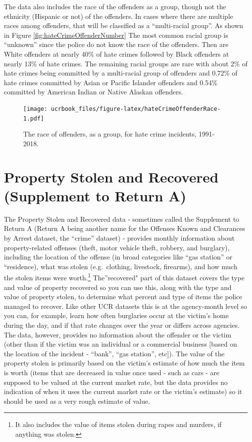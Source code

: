 \documentclass[
  12pt,
  openany]{book}
\begin{document}
The data also includes the race of the offenders as a group, though not the ethnicity (Hispanic or not) of the offenders. In cases where there are multiple races among offenders, that will be classified as a ``multi-racial group''. As shown in Figure \ref{fig:hateCrimeOffenderNumber} The most common racial group is ``unknown'' since the police do not know the race of the offenders. Then are White offenders at nearly 40\% of hate crimes followed by Black offenders at nearly 13\% of hate crimes. The remaining racial groups are rare with about 2\% of hate crimes being committed by a multi-racial group of offenders and 0.72\% of hate crimes committed by Asian or Pacific Islander offenders and 0.54\% committed by American Indian or Native Alaskan offenders.

\begin{figure}
\centering
\texttt{[image: ucrbook\_files/figure-latex/hateCrimeOffenderRace-1.pdf]}
\caption{\label{fig:hateCrimeOffenderRace}The race of offenders, as a group, for hate crime incidents, 1991-2018.}
\end{figure}

\hypertarget{stolen_property}{%
\chapter{Property Stolen and Recovered (Supplement to Return A)}\label{stolen_property}}

The Property Stolen and Recovered data - sometimes called the Supplement to Return A (Return A being another name for the Offenses Known and Clearances by Arrest dataset, the ``crime'' dataset) - provides monthly information about property-related offenses (theft, motor vehicle theft, robbery, and burglary), including the location of the offense (in broad categories like ``gas station'' or ``residence), what was stolen (e.g.~clothing, livestock, firearms), and how much the stolen items were worth.\footnote{It also includes the value of items stolen during rapes and murders, if anything was stolen.} The''recovered" part of this dataset covers the type and value of property recovered so you can use this, along with the type and value of property stolen, to determine what percent and type of items the police managed to recover. Like other UCR datasets this is at the agency-month level so you can, for example, learn how often burglaries occur at the victim's home during the day, and if that rate changes over the year or differs across agencies. The data, however, provides no information about the offender or the victim (other than if the victim was an individual or a commercial business {[}based on the location of the incident - ``bank'', ``gas station'', etc{]}). The value of the property stolen is primarily based on the victim's estimate of how much the item is worth (items that are decreased in value once used - such as cars - are supposed to be valued at the current market rate, but the data provides no indication of when it uses the current market rate or the victim's estimate) so it should be used as a very rough estimate of value.
\end{document}
